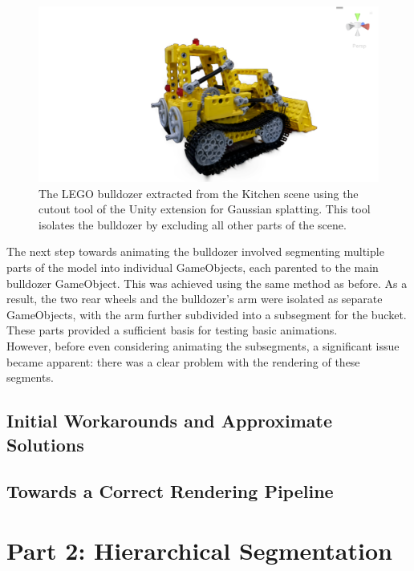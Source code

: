 \documentclass[12pt]{article}
\begin{document}
\begin{figure}[h!]
	\centering
	\includegraphics[width=\textwidth]{Images/WholeTruck.png}
	\caption{The LEGO bulldozer extracted from the Kitchen scene using the cutout tool of the Unity extension for Gaussian splatting. This tool isolates the bulldozer by excluding all other parts of the scene.}
	\label{fig:wholetruck}
\end{figure}
\newpage \noindent
The next step towards animating the bulldozer involved segmenting multiple parts of the model into individual GameObjects, each parented to the main bulldozer GameObject. This was achieved using the same method as before. As a result, the two rear wheels and the bulldozer's arm were isolated as separate GameObjects, with the arm further subdivided into a subsegment for the bucket. These parts provided a sufficient basis for testing basic animations.\\
However, before even considering animating the subsegments, a significant issue became apparent: there was a clear problem with the rendering of these segments.
\subsection{Initial Workarounds and Approximate Solutions}
\subsection{Towards a Correct Rendering Pipeline}
\section{Part 2: Hierarchical Segmentation}         
\printbibliography
\end{document}
